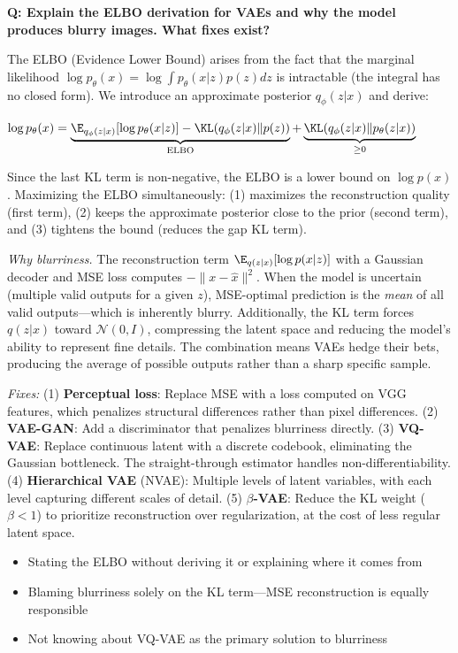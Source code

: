\begin{interviewq}
\textbf{Q: Explain the ELBO derivation for VAEs and why the model produces blurry images. What fixes exist?}

 \quad {} \quad \badgefreq{\freqhigh}

\stronganswer The ELBO (Evidence Lower Bound) arises from the fact that the marginal likelihood $\log p_\theta(x) = \log \int p_\theta(x|z) p(z) dz$ is intractable (the integral has no closed form). We introduce an approximate posterior $q_\phi(z|x)$ and derive:

$\log p_\theta(x) = \underbrace{\E_{q_\phi(z|x)}[\log p_\theta(x|z)] - \KL(q_\phi(z|x) \| p(z))}_{\text{ELBO}} + \underbrace{\KL(q_\phi(z|x) \| p_\theta(z|x))}_{\geq 0}$

Since the last KL term is non-negative, the ELBO is a lower bound on $\log p(x)$. Maximizing the ELBO simultaneously: (1) maximizes the reconstruction quality (first term), (2) keeps the approximate posterior close to the prior (second term), and (3) tightens the bound (reduces the gap KL term).

\textit{Why blurriness.} The reconstruction term $\E_{q(z|x)}[\log p(x|z)]$ with a Gaussian decoder and MSE loss computes $-\|x - \hat{x}\|^2$. When the model is uncertain (multiple valid outputs for a given $z$), MSE-optimal prediction is the \textit{mean} of all valid outputs---which is inherently blurry. Additionally, the KL term forces $q(z|x)$ toward $\mathcal{N}(0, I)$, compressing the latent space and reducing the model's ability to represent fine details. The combination means VAEs hedge their bets, producing the average of possible outputs rather than a sharp specific sample.

\textit{Fixes:} (1) \textbf{Perceptual loss}: Replace MSE with a loss computed on VGG features, which penalizes structural differences rather than pixel differences. (2) \textbf{VAE-GAN}: Add a discriminator that penalizes blurriness directly. (3) \textbf{VQ-VAE}: Replace continuous latent with a discrete codebook, eliminating the Gaussian bottleneck. The straight-through estimator handles non-differentiability. (4) \textbf{Hierarchical VAE} (NVAE): Multiple levels of latent variables, with each level capturing different scales of detail. (5) \textbf{$\beta$-VAE}: Reduce the KL weight ($\beta < 1$) to prioritize reconstruction over regularization, at the cost of less regular latent space.

\redflags
\begin{itemize}
    \item Stating the ELBO without deriving it or explaining where it comes from
    \item Blaming blurriness solely on the KL term---MSE reconstruction is equally responsible
    \item Not knowing about VQ-VAE as the primary solution to blurriness
\end{itemize}


\end{interviewq}
